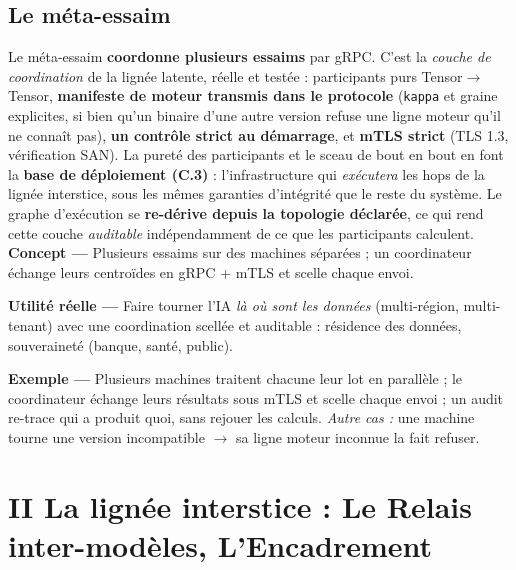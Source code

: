 \documentclass[11pt]{article}
\newcommand{\concept}[1]{{\color{efenavy}\textbf{Concept —} }#1\par}
\newcommand{\exemple}[1]{{\color{efeamber}\textbf{Exemple —} }#1\par}
\newcommand{\utilite}[1]{{\color{efeplum}\textbf{Utilité réelle —} }#1\par}
\begin{document}
\subsection{Le méta-essaim}
Le méta-essaim \textbf{coordonne plusieurs essaims} par gRPC. C'est la \emph{couche de
coordination} de la lignée latente, réelle et testée : participants purs
Tensor$\rightarrow$Tensor, \textbf{manifeste de moteur transmis dans le protocole}
(\texttt{kappa} et graine explicites, si bien qu'un binaire d'une
autre version refuse une ligne moteur qu'il ne connaît pas), \textbf{un contrôle strict au
démarrage}, et \textbf{mTLS strict} (TLS 1.3, vérification SAN). La pureté des participants et le sceau de bout en bout en
font la \textbf{base de déploiement (C.3)} : l'infrastructure qui \emph{exécutera} les hops de
la lignée interstice, sous les mêmes garanties d'intégrité que le reste du système. Le graphe
d'exécution se \textbf{re-dérive depuis la topologie déclarée}, ce qui rend cette couche
\emph{auditable} indépendamment de ce que les participants calculent.
\concept{Plusieurs essaims sur des machines séparées ; un coordinateur échange leurs centroïdes
en gRPC + mTLS et scelle chaque envoi.}
\utilite{Faire tourner l'IA \emph{là où sont les données} (multi-région, multi-tenant) avec une
coordination scellée et auditable : résidence des données, souveraineté (banque, santé, public).}
\exemple{Plusieurs machines traitent chacune leur lot en parallèle ; le coordinateur échange
leurs résultats sous mTLS et scelle chaque envoi ; un audit re-trace qui a produit quoi, sans
rejouer les calculs. \emph{Autre cas :} une machine tourne une version incompatible
$\rightarrow$ sa ligne moteur inconnue la fait refuser.}

\section{II \;\textbar\; La lignée interstice : Le Relais inter-modèles, L'Encadrement}
\end{document}
